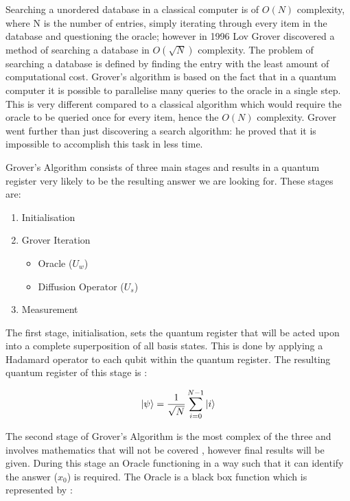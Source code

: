Searching a unordered database in a classical computer is of \(O(N)\) complexity, where N is the number of entries, simply iterating through every item in the database and questioning the oracle; however in 1996 Lov Grover discovered a method of searching a database in \(O(\sqrt{N})\) complexity. The problem of searching a database is defined by finding the entry with the least amount of computational cost. Grover's algorithm is based on the fact that in a quantum computer it is possible to parallelise many queries to the oracle in a single step. This is very different compared to a classical algorithm which would require the oracle to be queried once for every item, hence the \(O(N)\) complexity. Grover went further than just discovering a search algorithm: he proved that it is impossible to accomplish this task in less time.

Grover's Algorithm consists of three main stages and results in a quantum register very likely to be the resulting answer we are looking for. These stages are:

\begin{enumerate}
 \item Initialisation
 \item Grover Iteration
	\begin{itemize}
		\item Oracle (\(U_w\)) 
		\item Diffusion Operator (\(U_s\)) 
	\end{itemize}
 \item Measurement
\end{enumerate}

The first stage, initialisation, sets the quantum register that will be acted upon into a complete superposition of all basis states. This is done by applying a Hadamard operator to each qubit within the quantum register. The resulting quantum register of this stage is \cite{lomo2000}:

\begin{equation}
 \left| \psi \right> = \frac{1}{\sqrt{N}} \sum_{i=0}^{N-1} \left| i \right>
\end{equation}

The second stage of Grover's Algorithm is the most complex of the three and involves mathematics that will not be covered \cite{lomo2000}, however final results will be given. During this stage an Oracle functioning in a way such that it can identify the answer (\(x_0\)) is required. The Oracle is a black box function which is represented by \cite{lomo2000}:


